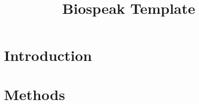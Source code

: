 \documentclass{article}
\begin{document}
\title{Biospeak Template}
\author{}
\date{}
\maketitle

\section{Introduction}
\lipsum[1]

\section{Methods}
\lipsum[2]


\end{document}
